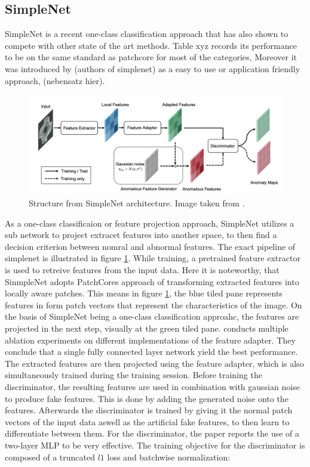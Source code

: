 \subsection{SimpleNet}
\label{subsec:simplenet}
SimpleNet \cite{liu2023simplenet} is a recent one-class classification approach that has also shown to compete with other state of the art methods. Table xyz records its performance to be on the same standard as patchcore 
for most of the categories, %
Moreover it was introduced by (authors of simplenet) as a easy to use or application friendly approach, (nebensatz hier).

\begin{figure}[ht]
    \centering
    \includegraphics[width=\textwidth]{figures/simplenet_architecture.png}
    \caption{Structure from SimpleNet architecture. Image taken from \cite{liu2023simplenet}.}
    \label{fig:simplenetpipeline}
\end{figure}

As a one-class classificaion or feature projection approach, SimpleNet utilizes a sub network to project extracet features into another space, to then find a decision criterion between nomral and 
abnormal features. The exact pipeline of simplenet is illustrated in figure \ref{fig:simplenetpipeline}. While training, a pretrained feature extractor is used to retreive features from the input data. Here it is noteworthy, 
that SinmpleNet adopts PatchCores approach of transforming extracted features into locally aware patches. This means in figure \ref{fig:simplenetpipeline}, the blue tiled pane represents features in form patch vectors 
that represent the characteristics of the image. On the basis of SimpleNet being a one-class classification approahc, the features are projected in the next step, visually at the green tiled pane. 
\cite{liu2023simplenet} conducts multiple ablation experiments on different implementations of the feature adapter. They conclude that a single fully connected layer network yield the best 
performance. The extracted features are then projected using the feature adapter, which is also simultaneously trained during the training session. Before training the discriminator, the resulting 
features are used in combination with gaussian noise to produce fake features. This is done by adding the generated noise onto the features. Afterwards the discriminator is trained by giving it 
the normal patch vectors of the input data aswell as the artificial fake features, to then learn to differentiate between them. For the discriminator, the paper reports the use of a two-layer 
MLP to be very effective. The training objective for the discriminator is composed of a truncated $l1$ loss and batchwise normalization:

